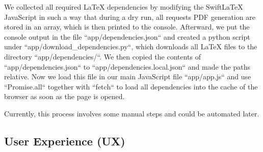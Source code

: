 We collected all required LaTeX dependencies by modifying the SwiftLaTeX JavaScript in such a way that during a dry run,
all requests PDF generation are stored in an array, which is then printed to the console.
Afterward, we put the console output in the file ``app/dependencies.json`` and created a python script under ``app/download\_dependencies.py``,
which downloads all LaTeX files to the directory ``app/dependencies/``.
We then copied the contents of ``app/dependencies.json`` to ``app/dependencies.local.json`` and made the paths relative.
Now we load this file in our main JavaScript file ``app/app.js`` and use ``Promise.all`` together with ``fetch`` to load
all dependencies into the cache of the browser as soon as the page is opened.

Currently, this process involves some manual steps and could be automated later.

\subsection{User Experience (UX)}\label{subsec:ux}
